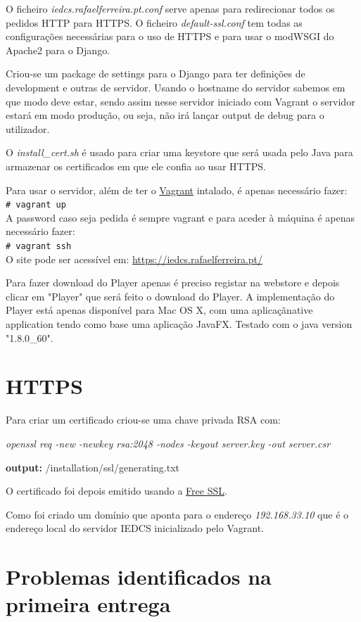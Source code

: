 \documentclass[pdftex,12pt,a4paper]{report}
\newcommand{\shellcmd}[1]{\\\indent\indent\texttt{\footnotesize\# #1}\\}
\begin{document}
O ficheiro \textit{iedcs.rafaelferreira.pt.conf} serve apenas para redirecionar todos os pedidos HTTP para HTTPS. O ficheiro \textit{default-ssl.conf} tem todas as configurações necessárias para o uso de HTTPS e para usar o modWSGI do Apache2 para o Django.

Criou-se um package de settings para o Django para ter definições de development e outras de servidor. Usando o hostname do servidor sabemos em que modo deve estar, sendo assim nesse servidor iniciado com Vagrant o servidor estará em modo produção, ou seja, não irá lançar output de debug para o utilizador.

O \textit{install{\_}cert.sh} é usado para criar uma keystore que será usada pelo Java para armazenar os certificados em que ele confia ao usar HTTPS.	
	
Para usar o servidor, além de ter o \href{https://www.vagrantup.com/downloads.html}{Vagrant} intalado, é apenas necessário fazer:
\shellcmd{vagrant up}

A password caso seja pedida é sempre vagrant e para aceder à máquina é apenas necessário fazer: \shellcmd{vagrant ssh}

O site pode ser acessível em: \url{https://iedcs.rafaelferreira.pt/}

Para fazer download do Player apenas é preciso registar na webstore e depois clicar em "Player" que será feito o download do Player. A implementação do Player está apenas disponível para Mac OS X, com uma aplicaçãnative application  tendo como base uma aplicação JavaFX. Testado com o java version "1.8.0{\_}60".

\section{HTTPS}
Para criar um certificado criou-se uma chave privada RSA com:

\textit{openssl req -new -newkey rsa:2048 -nodes -keyout server.key -out server.csr}

\textbf{output:} /installation/ssl/generating.txt

O certificado foi depois emitido usando a \href{https://www.instantssl.com/free-ssl-certificate.html}{Free SSL}.

Como foi criado um domínio que aponta para o endereço \textit{192.168.33.10} que é o endereço local do servidor IEDCS inicializado pelo Vagrant.

\section{Problemas identificados na primeira entrega}
\end{document}
